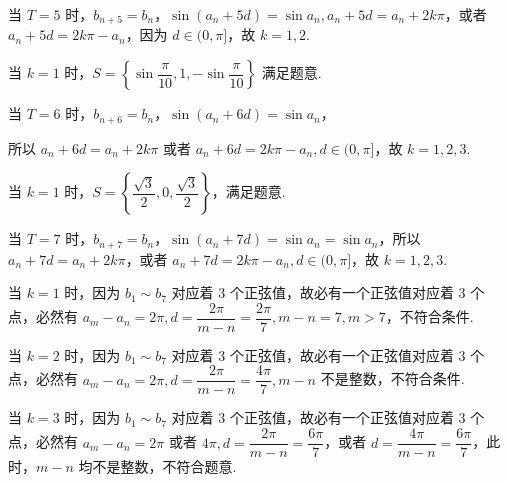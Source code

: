 \begin{solutions}
\begin{center}
\end{center}

当 $T=5$ 时，$b_{n+5}=b_n$，$\sin(a_n+5d)=\sin a_n, a_n+5d=a_n+2k\pi$，或者 $a_n+5d=2k\pi-a_n$，因为 $d\in(0, \pi]$，故 $k=1, 2$.

当 $k=1$ 时，$S=\left\{\sin\dfrac{\pi}{10}, 1, -\sin\dfrac{\pi}{10}\right\}$ 满足题意.

当 $T=6$ 时，$b_{n+6}=b_n$，$\sin(a_n+6d)=\sin a_n$，

所以 $a_n+6d=a_n+2k\pi$ 或者 $a_n+6d=2k\pi-a_n, d\in(0, \pi]$，故 $k=1, 2, 3$.

当 $k=1$ 时，$S=\left\{\dfrac{\sqrt{3}}{2}, 0, \dfrac{\sqrt{3}}{2}\right\}$，满足题意.

当 $T=7$ 时，$b_{n+7}=b_n$，$\sin(a_n+7d)=\sin a_n=\sin a_n$，所以 $a_n+7d=a_n+2k\pi$，或者 $a_n+7d=2k\pi-a_n, d\in(0, \pi]$，故 $k=1, 2, 3$.

当 $k=1$ 时，因为 $b_1 \sim b_7$ 对应着 3 个正弦值，故必有一个正弦值对应着 3 个点，必然有 $a_m-a_n=2\pi, d=\dfrac{2\pi}{m-n}=\dfrac{2\pi}{7}, m-n=7, m>7$，不符合条件.

当 $k=2$ 时，因为 $b_1 \sim b_7$ 对应着 3 个正弦值，故必有一个正弦值对应着 3 个点，必然有 $a_m-a_n=2\pi, d=\dfrac{2\pi}{m-n}=\dfrac{4\pi}{7}, m-n$ 不是整数，不符合条件.

当 $k=3$ 时，因为 $b_1 \sim b_7$ 对应着 3 个正弦值，故必有一个正弦值对应着 3 个点，必然有 $a_m-a_n=2\pi$ 或者 $4\pi, d=\dfrac{2\pi}{m-n}=\dfrac{6\pi}{7}$，或者 $d=\dfrac{4\pi}{m-n}=\dfrac{6\pi}{7}$，此时，$m-n$ 均不是整数，不符合题意.


\end{solutions}
